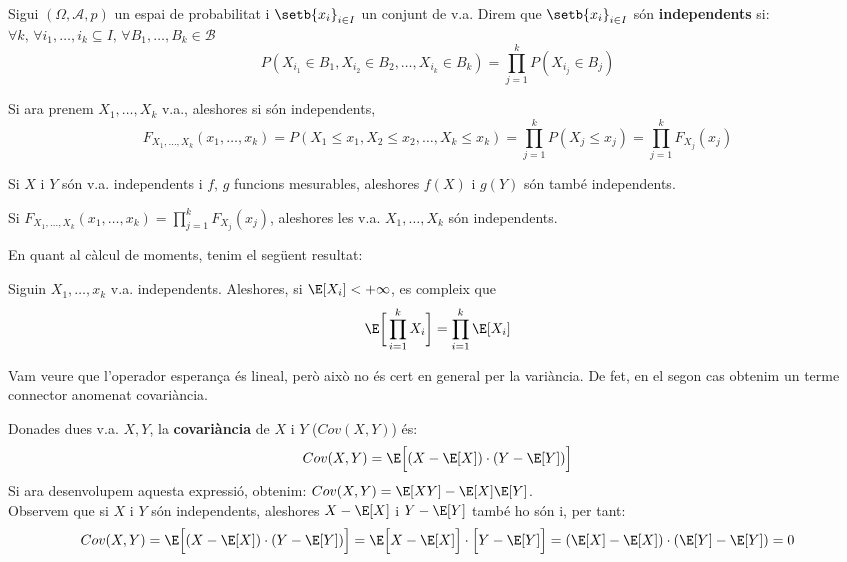 \begin{defi}
  Sigui $(\Omega, \mathcal{A}, p)$ un espai de probabilitat i $\setb{x_{i}}_{i\in I}$ un conjunt de v.a. Direm que $\setb{x_{i}}_{i\in I}$ són \textbf{independents} si: $\forall k, \, \forall {i_{1}, \ldots, i_{k}} \subseteq I, \, \forall B_{1}, \ldots, B_{k} \in \mathcal{B}$
  \[
    P(X_{i_{1}} \in B_{1}, X_{i_{2}}\in B_{2}, \ldots , X_{i_{k}}\in B_{k}) = \prod\limits_{j=1}^{k}P(X_{i_{j}}\in B_{j})
  \]
  
  Si ara prenem $X_{1}, \ldots, X_{k}$ v.a., aleshores si són independents, 
  \[
    F_{X_{1}, \ldots, X_{k}}(x_{1}, \dots, x_{k}) = P(X_{1} \leq x_{1}, X_{2} \leq x_{2}, \ldots , X_{k} \leq x_{k}) = \prod\limits_{j=1}^{k}P(X_{j} \leq x_{j}) = \prod\limits_{j=1}^{k}F_{X_{j}}(x_{j})
  \]
\end{defi}

\newpage

\begin{obs}
  Si $X$ i $Y$ són v.a. independents i $f,\, g$ funcions mesurables, aleshores $f(X)$ i $g(Y)$ són també independents.
\end{obs}

\begin{obs}
  Si $F_{X_{1}, \ldots, X_{k}}(x_{1}, \dots, x_{k}) = \prod\limits_{j=1}^{k}F_{X_{j}}(x_{j})$, aleshores les v.a. $X_{1}, \ldots , X_{k}$ són independents.
\end{obs}

En quant al càlcul de moments, tenim el següent resultat:

\begin{thm}
  Siguin $X_{1}, \ldots, x_{k}$ v.a. independents. Aleshores, si $\E[X_{i}] < +\infty$, es compleix que $$\E\bigg[\prod\limits_{i=1}^{k}X_{i} \bigg] = \prod\limits_{i=1}^{k}\E[X_{i}]$$
\end{thm}

Vam veure que l'operador esperança és lineal, però això no és cert en general per la variància. De fet, en el segon cas obtenim un terme connector anomenat covariància.

\begin{defi}
  Donades dues v.a. $X,Y$, la \textbf{covariància} de $X$ i $Y$ ($Cov(X,Y)$) és:
  \[
    Cov(X,Y) = \E\Big[(X-\E[X])\cdot (Y-\E[Y]) \Big]
  \]
  Si ara desenvolupem aquesta expressió, obtenim: $Cov(X,Y) = \E[XY] - \E[X]\E[Y]$. \\
  
  Observem que si $X$ i $Y$ són independents, aleshores $X - \E[X]$ i $Y - \E[Y]$ també ho són i, per tant:
  \[
    Cov(X,Y) = \E\Big[(X-\E[X])\cdot (Y-\E[Y]) \Big] = \E\Big[X-\E[X]\Big]\cdot \Big[Y-\E[Y] \Big] = (\E[X] - \E[X]) \cdot (\E[Y] - \E[Y]) = 0
  \]
\end{defi}

